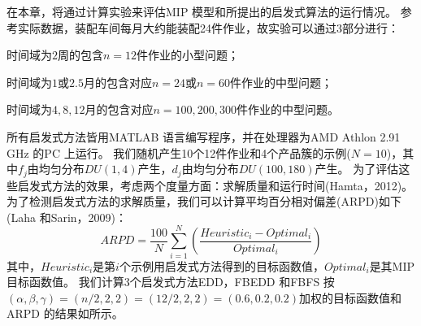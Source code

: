 在本章，将通过计算实验来评估MIP 模型和所提出的启发式算法的运行情况。
参考实际数据，装配车间每月大约能装配24件作业，故实验可以通过3部分进行：\begin{inparaenum}[(1)]
\item 时间域为$2$周的包含$n=12$件作业的小型问题；
\item 时间域为$1\text{或}2.5$月的包含对应$n=24\text{或}n=60$件作业的中型问题；
\item 时间域为$4,8,12$月的包含对应$n=100,200,300$件作业的中型问题。
\end{inparaenum}
所有启发式方法皆用MATLAB 语言编写程序，并在处理器为AMD Athlon 2.91 GHz 的PC 上运行。
我们随机产生10个12件作业和4个产品簇的示例($N=10$)，其中$f_j$由均匀分布$DU(1,4)$产生，$d_j$由均匀分布$DU(100,180)$产生。
为了评估这些启发式方法的效果，考虑两个度量方面：求解质量和运行时间(Hamta，2012)。
为了检测启发式方法的求解质量，我们可以计算平均百分相对偏差(ARPD)如下(Laha 和Sarin，2009)：
\[ARPD = \frac{100}{N}\sum_{i=1}^N\left(\frac{Heuristic_i - Optimal_i}{Optimal_i}\right)
\]
其中，$Heuristic_i$是第$i$个示例用启发式方法得到的目标函数值，$Optimal_i$是其MIP 目标函数值。
我们计算3个启发式方法EDD，FBEDD 和FBFS 按$(\alpha,\beta,\gamma)=(n/2,2,2)=(12/2,2,2)=(0.6,0.2,0.2)$加权的目标函数值和ARPD 的结果如所示。
